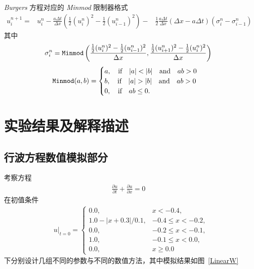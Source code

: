 \documentclass[10.5pt
]{article}
\begin{document}
\textit{Burgers} 方程对应的 \textit{Minmod} 限制器格式
\begin{equation}
\begin{aligned}
u_i^{n+1}=&
  u_i^n-\frac{a \Delta t}{\Delta x}\left( \frac{1}{2} (u_i^n)^2- \frac{1}{2} (u_{i-1}^n)^2 \right)-
 &\frac{1}{2} \frac{a \Delta t}{\Delta x}(\Delta x-a \Delta t)\left(\sigma_i^n-\sigma_{i-1}^n\right)
\end{aligned}
\end{equation}
其中
\begin{equation}
	\sigma_i^n = \verb|Minmod| \left( \frac{ \frac{1}{2} (u_i^n)^2 - \frac{1}{2} (u_{i-1}^{n})^2 }{ \Delta x }, \frac{ \frac{1}{2} (u_{i+1}^n)^2 - \frac{1}{2} (u_{i}^{n})^2}{ \Delta x } \right)
\end{equation}
\begin{equation}
	\verb|Minmod|(a, b) = 
	\begin{cases}
		a, \qif |a| < |b| \qand ab > 0\\
		b, \qif |a| > |b| \qand ab > 0\\
		0, \qif ab \leq 0.
	\end{cases}
\end{equation}


\section{实验结果及解释描述}
\subsection{行波方程数值模拟部分}
考察方程
\begin{align}
\frac{\partial u}{\partial t} + \frac{\partial u}{\partial x} = 0
\end{align}
在初值条件
\begin{align}
& u|_{t=0} = \left\{\begin{array}{ll} 0.0, & x < -0.4, \\
1.0 - |x + 0.3| / 0.1, & -0.4 \le x < -0.2, \\
0.0, & -0.2 \le x < -0.1, \\
1.0 , & -0.1 \le x < 0.0, \\
0.0, & x \ge 0.0
\end{array}\right.
\end{align}
下分别设计几组不同的参数与不同的数值方法，其中模拟结果如图~\ref{LinearW}
\end{document}
